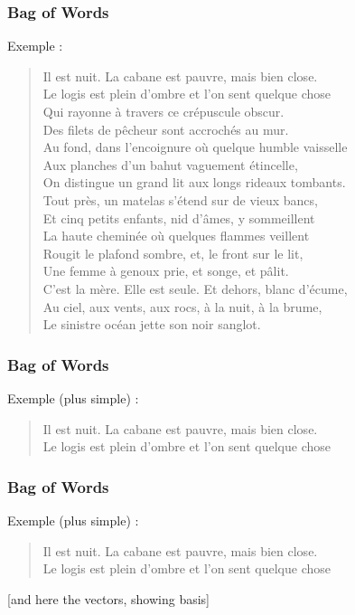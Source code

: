 \begin{frame}[t]
  \frametitle{Bag of Words}
  \vspace{1cm}
  Exemple :

  \begin{quote}
    Il est nuit. La cabane est pauvre, mais bien close.\\
    Le logis est plein d'ombre et l'on sent quelque chose\\
    Qui rayonne à travers ce crépuscule obscur.\\
    Des filets de pêcheur sont accrochés au mur.\\
    Au fond, dans l'encoignure où quelque humble vaisselle\\
    Aux planches d'un bahut vaguement étincelle,\\
    On distingue un grand lit aux longs rideaux tombants.\\
    Tout près, un matelas s'étend sur de vieux bancs,\\
    Et cinq petits enfants, nid d'âmes, y sommeillent\\
    La haute cheminée où quelques flammes veillent\\
    Rougit le plafond sombre, et, le front sur le lit,\\
    Une femme à genoux prie, et songe, et pâlit.\\
    C'est la mère. Elle est seule. Et dehors, blanc d'écume,\\
    Au ciel, aux vents, aux rocs, à la nuit, à la brume,\\
    Le sinistre océan jette son noir sanglot.
  \end{quote}
\end{frame}

\begin{frame}[t]
  \frametitle{Bag of Words}
  \vspace{1cm}
  Exemple (plus simple) :

  \begin{quote}
    Il est nuit. La cabane est pauvre, mais bien close.\\
    Le logis est plein d'ombre et l'on sent quelque chose\\
  \end{quote}
\end{frame}

\begin{frame}[t]
  \frametitle{Bag of Words}
  \vspace{1cm}
  Exemple (plus simple) :

  \begin{quote}
    Il est nuit. La cabane est pauvre, mais bien close.\\
    Le logis est plein d'ombre et l'on sent quelque chose\\
  \end{quote}

  [and here the vectors, showing basis]
\end{frame}

